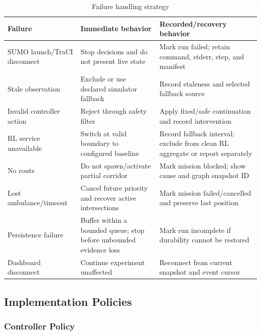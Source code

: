 \begin{table}[htbp]
\centering
\caption{Failure handling strategy}
\label{tab:errors}
\begin{tabularx}{\textwidth}{p{}YY}
\toprule
\textbf{Failure} & \textbf{Immediate behavior} & \textbf{Recorded/recovery behavior}\\
\midrule
SUMO launch/TraCI disconnect & Stop decisions and do not present live state & Mark run failed; retain command, stderr, step, and manifest\\
Stale observation & Exclude or use declared simulator fallback & Record staleness and selected fallback source\\
Invalid controller action & Reject through safety filter & Apply fixed/safe continuation and record intervention\\
RL service unavailable & Switch at valid boundary to configured baseline & Record fallback interval; exclude from clean RL aggregate or report separately\\
No route & Do not spawn/activate partial corridor & Mark mission blocked; show cause and graph snapshot ID\\
Lost ambulance/timeout & Cancel future priority and recover active intersections & Mark mission failed/cancelled and preserve last position\\
Persistence failure & Buffer within a bounded queue; stop before unbounded evidence loss & Mark run incomplete if durability cannot be restored\\
Dashboard disconnect & Continue experiment unaffected & Reconnect from current snapshot and event cursor\\
\bottomrule
\end{tabularx}
\end{table}

\subsection{Implementation Policies}

\subsubsection{Controller Policy}

